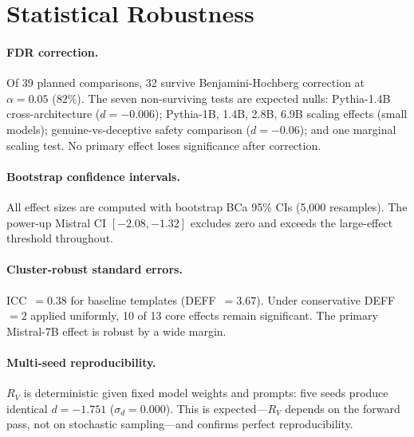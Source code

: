 \documentclass{article}
\newcommand{\RV}{R_V}
\newcommand{\dcohen}{d}
\begin{document}




\appendix

\section{Statistical Robustness}
\label{app:stats}

\paragraph{FDR correction.}
Of 39 planned comparisons, 32 survive Benjamini-Hochberg correction at $\alpha = 0.05$ (82\%).
The seven non-surviving tests are expected nulls: Pythia-1.4B cross-architecture
($\dcohen = -0.006$); Pythia-1B, 1.4B, 2.8B, 6.9B scaling effects (small models);
genuine-vs-deceptive safety comparison ($\dcohen = -0.06$);
and one marginal scaling test.
No primary effect loses significance after correction.

\paragraph{Bootstrap confidence intervals.}
All effect sizes are computed with bootstrap BCa 95\% CIs (5{,}000 resamples).
The power-up Mistral CI $[-2.08, -1.32]$ excludes zero and exceeds the
large-effect threshold throughout.

\paragraph{Cluster-robust standard errors.}
ICC~$= 0.38$ for baseline templates (DEFF~$= 3.67$).
Under conservative DEFF~$= 2$ applied uniformly, 10 of 13 core effects remain significant.
The primary Mistral-7B effect is robust by a wide margin.

\paragraph{Multi-seed reproducibility.}
$\RV$ is deterministic given fixed model weights and prompts: five seeds produce identical
$\dcohen = -1.751$ ($\sigma_d = 0.000$).
This is expected---$\RV$ depends on the forward pass, not on stochastic sampling---and
confirms perfect reproducibility.
\end{document}
